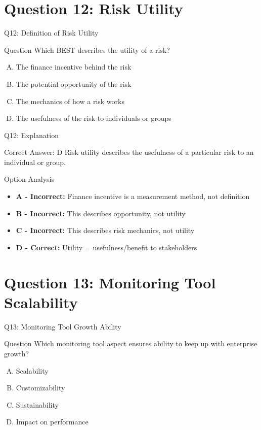 \documentclass{beamer}
\begin{document}
	\section{Question 12: Risk Utility}
	
	\begin{frame}{Q12: Definition of Risk Utility}
		\begin{block}{Question}
			Which BEST describes the utility of a risk?
		\end{block}
		\begin{enumerate}[(A)]
			\item The finance incentive behind the risk
			\item The potential opportunity of the risk
			\item The mechanics of how a risk works
			\item The usefulness of the risk to individuals or groups
		\end{enumerate}
	\end{frame}
	
	\begin{frame}{Q12: Explanation}
		\begin{block}{Correct Answer: D}
			Risk utility describes the usefulness of a particular risk to an individual or group.
		\end{block}
		\begin{block}{Option Analysis}
			\begin{itemize}
				\item \textbf{A - Incorrect:} Finance incentive is a measurement method, not definition
				\item \textbf{B - Incorrect:} This describes opportunity, not utility
				\item \textbf{C - Incorrect:} This describes risk mechanics, not utility
				\item \textbf{D - Correct:} Utility = usefulness/benefit to stakeholders
			\end{itemize}
		\end{block}
	\end{frame}
	
	\section{Question 13: Monitoring Tool Scalability}
	
	\begin{frame}{Q13: Monitoring Tool Growth Ability}
		\begin{block}{Question}
			Which monitoring tool aspect ensures ability to keep up with enterprise growth?
		\end{block}
		\begin{enumerate}[(A)]
			\item Scalability
			\item Customizability
			\item Sustainability
			\item Impact on performance
		\end{enumerate}
	\end{frame}
	
\end{document}
